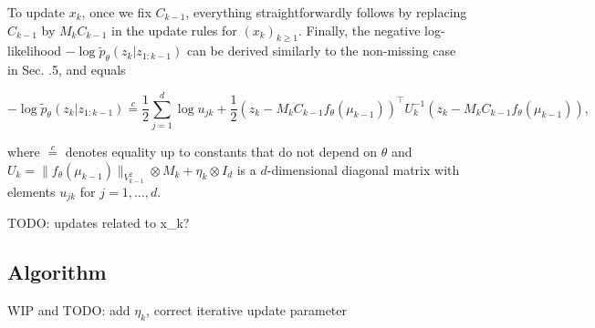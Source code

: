 \documentclass{mldsmsc}
\begin{document}
To update \(x_k\), once we fix \(C_{k-1}\), everything straightforwardly follows by replacing \(C_{k-1}\) by \(M_k C_{k-1}\) in the update rules for \((x_k)_{k \geq 1}\). Finally, the negative log-likelihood \(-\log \tilde{p}_\theta (z_k | z_{1:k-1})\) can be derived similarly to the non-missing case in Sec. .5, and equals

\begin{equation}
-\log \tilde{p}_\theta (z_k | z_{1:k-1}) \overset{c}{=} \frac{1}{2} \sum_{j=1}^{d} \log u_{jk} + \frac{1}{2} (z_k - M_k C_{k-1} f_\theta(\mu_{k-1}))^\top U_k^{-1} (z_k - M_k C_{k-1} f_\theta(\mu_{k-1})),
\end{equation}

where \(\overset{c}{=}\) denotes equality up to constants that do not depend on \(\theta\) and \(U_k = \|f_\theta(\mu_{k-1})\|_{V_{k-1}^2} \otimes M_k + \eta_k \otimes I_d\) is a \(d\)-dimensional diagonal matrix with elements \(u_{jk}\) for \(j = 1, \ldots, d\). \newline

TODO: updates related to x_k?


\subsection{Algorithm}

WIP and TODO: add $\eta_k$, correct iterative update parameter
\end{document}

